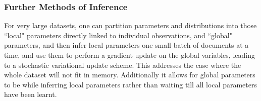 \subsubsection*{Further Methods of Inference}
For very large datasets, one can partition parameters and distributions into those ``local" parameters directly linked to individual observations, and ``global" parameters, and then infer local parameters one small batch of documents at a time, and use them to perform a gradient update\cite{RobbinsMonro1951} on the global variables, leading to a stochastic variational update scheme\cite{Hoffman2012}. This addresses the case where the whole dataset will not fit in memory. Additionally it allows for global parameters to be while inferring local parameters rather than waiting till all local parameters have been learnt.
 
